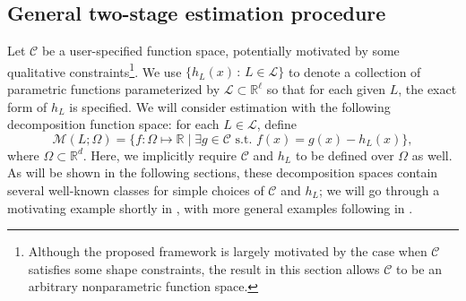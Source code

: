 \documentclass[12pt]{article}
\begin{document}
\subsection{General two-stage estimation procedure}\label{section:general-estimation}

Let $\mathcal{C}$ be a user-specified function space, potentially motivated by some qualitative constraints\footnote{Although the proposed framework is largely motivated by the case when $\mathcal{C}$ satisfies some shape constraints, the result in this section allows $\mathcal{C}$ to be an arbitrary nonparametric function space.}. We use $\{h_L(x)\, :\, L\in\mathcal{L}\}$ to denote a collection of parametric functions parameterized by $\mathcal{L}\subset\mathbb{R}^\ell$ so that for each given $L$, the exact form of $h_L$ is specified. We will consider estimation with the following decomposition function space: for each $L\in\mathcal{L}$, define
\begin{equation}\label{eq:general-decomposition}
    \mathcal{M}(L; \Omega) = \{f:\Omega \mapsto\mathbb{R}  \mid  \exists g \in \mathcal{C}\text{ s.t. } f(x)=g(x)-h_L(x)\},
\end{equation}
where $\Omega\subset\mathbb{R}^d$. Here, we implicitly require $\mathcal{C}$ and $h_{L}$ to be defined over $\Omega$ as well. As will be shown in the following sections, these decomposition spaces contain several well-known classes for simple choices of $\mathcal{C}$ and $h_{L}$; we will go through a motivating example shortly in , with more general examples following in .
\end{document}
